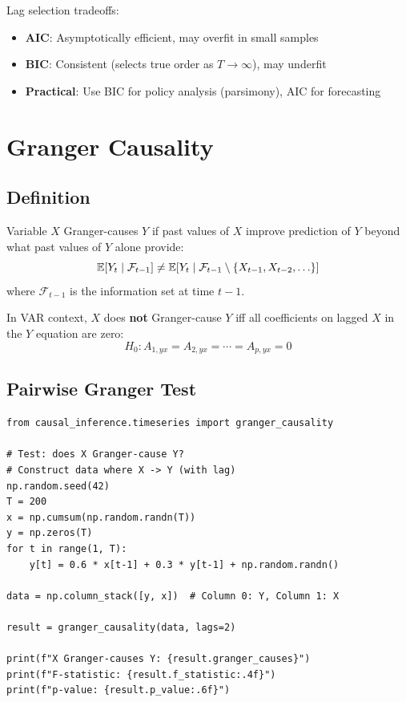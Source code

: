 \begin{insight}
Lag selection tradeoffs:
\begin{itemize}
    \item \textbf{AIC}: Asymptotically efficient, may overfit in small samples
    \item \textbf{BIC}: Consistent (selects true order as $T \to \infty$), may underfit
    \item \textbf{Practical}: Use BIC for policy analysis (parsimony), AIC for forecasting
\end{itemize}
\end{insight}


\section{Granger Causality}

\subsection{Definition}

\begin{definition}
Variable $X$ Granger-causes $Y$ if past values of $X$ improve prediction of $Y$ beyond what past values of $Y$ alone provide:
\begin{equation}
\mathbb{E}[Y_t \mid \mathcal{F}_{t-1}] \neq \mathbb{E}[Y_t \mid \mathcal{F}_{t-1} \setminus \{X_{t-1}, X_{t-2}, \ldots\}]
\end{equation}
where $\mathcal{F}_{t-1}$ is the information set at time $t-1$.
\end{definition}

In VAR context, $X$ does \textbf{not} Granger-cause $Y$ iff all coefficients on lagged $X$ in the $Y$ equation are zero:
\begin{equation}
H_0: A_{1,yx} = A_{2,yx} = \cdots = A_{p,yx} = 0
\end{equation}

\subsection{Pairwise Granger Test}

\begin{verbatim}
from causal_inference.timeseries import granger_causality

# Test: does X Granger-cause Y?
# Construct data where X -> Y (with lag)
np.random.seed(42)
T = 200
x = np.cumsum(np.random.randn(T))
y = np.zeros(T)
for t in range(1, T):
    y[t] = 0.6 * x[t-1] + 0.3 * y[t-1] + np.random.randn()

data = np.column_stack([y, x])  # Column 0: Y, Column 1: X

result = granger_causality(data, lags=2)

print(f"X Granger-causes Y: {result.granger_causes}")
print(f"F-statistic: {result.f_statistic:.4f}")
print(f"p-value: {result.p_value:.6f}")
\end{verbatim}

